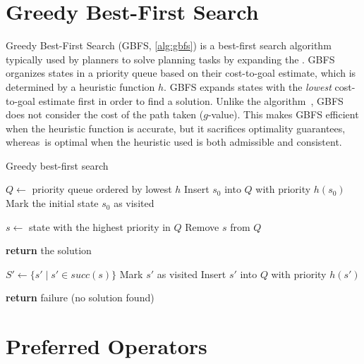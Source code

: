 \documentclass[ppgc,diss,english]{iiufrgs}
\begin{document}
\section{Greedy Best-First Search}
\label{sec:background-gbfs}
Greedy Best-First Search (GBFS, \cref{alg:gbfs}) is a best-first search algorithm typically used by planners to solve planning tasks by expanding the \fsp. GBFS organizes states in a priority queue based on their cost-to-goal estimate, which is determined by a heuristic function $h$. GBFS expands states with the \emph{lowest} cost-to-goal estimate first in order to find a solution. Unlike the \astar algorithm~\cite{Hart.etal/1968}, GBFS does not consider the cost of the path taken ($g$-value). This makes GBFS efficient when the heuristic function is accurate, but it sacrifices optimality guarantees, whereas~\astar is optimal when the heuristic used is both admissible and consistent.

\begin{algorithm}[tb]
\caption{Greedy best-first search}
\label{alg:gbfs}
\begin{algorithmic}[1]
  \State $Q \gets$ priority queue ordered by lowest $h$
    \State Insert $s_0$ into $Q$ with priority $h(s_0)$
    \State Mark the initial state $s_0$ as visited
  \EndIf

    \State $s \gets$ state with the highest priority in $Q$
    \State Remove $s$ from $Q$

      \State \textbf{return} the solution
    \EndIf

    \State $S' \gets \{s' \mid s' \in succ(s)\}$
        \State Mark $s'$ as visited
        \State Insert $s'$ into $Q$ with priority $h(s')$
      \EndIf
    \EndFor
  \EndWhile

  \State \textbf{return} failure (no solution found)
\EndProcedure
\end{algorithmic}
\end{algorithm}

\section{Preferred Operators}
\label{sec:background-preferred-operators}
\end{document}
